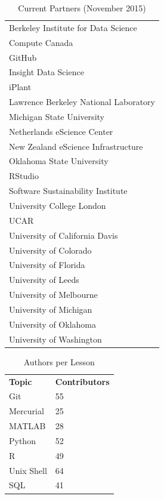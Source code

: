 \documentclass[10pt,a4paper,twocolumn]{article}
\begin{document}
\begin{table}[h]
\begin{tabular}{l}
Berkeley Institute for Data Science \\
Compute Canada \\
GitHub \\
Insight Data Science \\
iPlant \\
Lawrence Berkeley National Laboratory \\
Michigan State University \\
Netherlands eScience Center \\
New Zealand eScience Infrastructure \\
Oklahoma State University \\
RStudio \\
Software Sustainability Institute \\
University College London \\
UCAR \\
University of California Davis \\
University of Colorado \\
University of Florida \\
University of Leeds \\
University of Melbourne \\
University of Michigan \\
University of Oklahoma \\
University of Washington \\
\end{tabular}
\caption{Current Partners (November 2015)}
\label{t:current-partners}
\end{table}

\begin{table}[h]
\begin{tabular}{ll}
\textbf{Topic} & \textbf{Contributors} \\
Git & 55 \\
Mercurial & 25 \\
MATLAB & 28 \\
Python & 52 \\
R & 49 \\
Unix Shell & 64 \\
SQL & 41
\end{tabular}
\caption{Authors per Lesson}
\label{t:authors-per-lesson}
\end{table}
\end{document}
